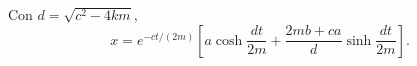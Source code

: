 Con \(d=\sqrt{c^2-4km}\),
\[x=e^{-ct/(2m)}\left[a\cosh\frac{dt}{2m}+\frac{2mb+ca}{d}\sinh\frac{dt}{2m}\right].\]
